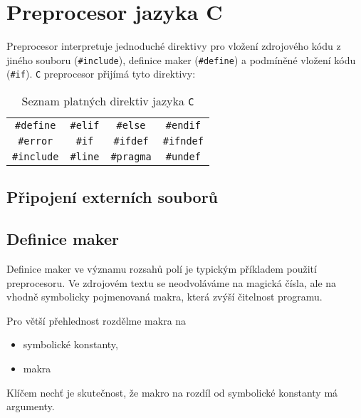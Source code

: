   \section{Preprocesor jazyka C}
    Preprocesor interpretuje jednoduché direktivy pro vložení zdrojového kódu z jiného souboru 
    (\lstinline[style=luaCStyle]!#include!), definice maker 
    (\lstinline[style=luaCStyle]!#define!) a podmíněné vložení kódu 
    (\lstinline[style=luaCStyle]!#if!). \texttt{C} preprocesor přijímá tyto direktivy:
    
    \begin{table}[ht!]
      \centering
      \begin{tabular}{c c c c}
        \hline
        \lstinline[style=luaCStyle]!#define!  & \lstinline[style=luaCStyle]!#elif! & 
        \lstinline[style=luaCStyle]!#else!    & \lstinline[style=luaCStyle]!#endif!  \\
        \lstinline[style=luaCStyle]!#error!   & \lstinline[style=luaCStyle]!#if! & 
        \lstinline[style=luaCStyle]!#ifdef!   & \lstinline[style=luaCStyle]!#ifndef! \\
        \lstinline[style=luaCStyle]!#include! & \lstinline[style=luaCStyle]!#line! & 
        \lstinline[style=luaCStyle]!#pragma!  & \lstinline[style=luaCStyle]!#undef!  \\
        \hline            
      \end{tabular}
      \caption{Seznam platných direktiv jazyka \texttt{C}}\label{S4101C1:C_tab_direktiva}
    \end{table} 
    
    \subsection{Připojení externích souborů}
    
    \subsection{Definice maker}
      Definice maker ve významu rozsahů polí je typickým příkladem použití preprocesoru. Ve 
      zdrojovém textu se neodvoláváme na magická čísla, ale na vhodně symbolicky pojmenovaná makra, 
      která zvýší čitelnost programu.
      
      Pro větší přehlednost rozdělme makra na 
      \begin{itemize}
       \item symbolické konstanty,
       \item makra
      \end{itemize}
      Klíčem nechť je skutečnost, že makro na rozdíl od symbolické konstanty má argumenty.
